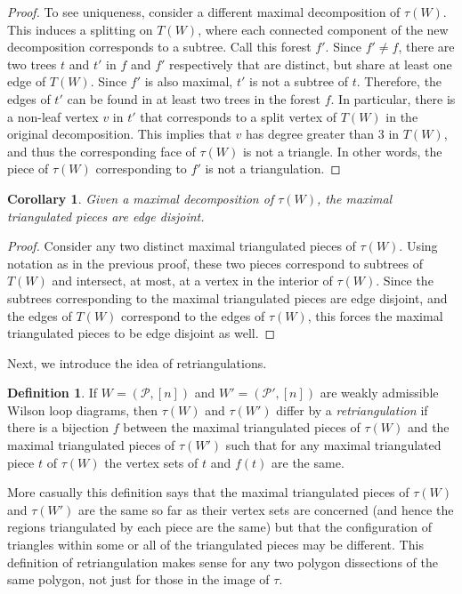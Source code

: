 \documentclass[11pt]{article}
\newcommand{\cP}{\mathcal{P}}
\newtheorem{cor}[thm]{Corollary}
\theoremstyle{remark}
\theoremstyle{definition}
\newtheorem{dfn}[thm]{Definition}
\begin{document}
\begin{proof}
To see uniqueness, consider a different maximal decomposition of $\tau(W)$. This induces a splitting on $T(W)$, where each connected component of the new decomposition corresponds to a subtree. Call this forest $f'$. Since $f' \neq f$, there are two trees $t$ and $t'$ in $f$ and $f'$ respectively that are distinct, but share at least one edge of $T(W)$. Since $f'$ is also maximal, $t'$ is not a subtree of $t$. Therefore, the edges of $t'$ can be found in at least two trees in the forest $f$. In particular, there is a non-leaf vertex $v$ in $t'$ that corresponds to a split vertex of $T(W)$ in the original decomposition.
This implies that $v$ has degree greater than $3$ in $T(W)$, and thus the corresponding face of $\tau(W)$ is not a triangle. In other words, the piece of $\tau(W)$ corresponding to $f'$ is not a triangulation. 
\end{proof}

\begin{cor} \label{maxtriangdisjointcor}
Given a maximal decomposition of $\tau(W)$, the maximal triangulated pieces are edge disjoint.
\end{cor}

\begin{proof}
Consider any two distinct maximal triangulated pieces of $\tau(W)$. Using notation as in the previous proof, these two pieces correspond to subtrees of $T(W)$ and intersect, at most, at a vertex in the interior of $\tau(W)$. Since the subtrees corresponding to the maximal triangulated pieces are edge disjoint, and the edges of $T(W)$ correspond to the edges of $\tau(W)$, this forces the maximal triangulated pieces to be edge disjoint as well.
\end{proof}


Next, we introduce the idea of retriangulations. 
\begin{dfn} \label{retriangulation}
  If $W = (\cP, [n])$ and $W' = (\cP', [n])$ are weakly admissible Wilson loop diagrams, then $\tau(W)$ and $\tau(W')$  differ by a \emph{retriangulation} if there is a bijection $f$ between the maximal triangulated pieces of $\tau(W)$ and the maximal triangulated pieces of $\tau(W')$ such that for any maximal triangulated piece $t$ of $\tau(W)$ the vertex sets of $t$ and $f(t)$ are the same.
\end{dfn}
More casually this definition says that the maximal triangulated pieces of $\tau(W)$ and $\tau(W')$ are the same so far as their vertex sets are concerned (and hence the regions triangulated by each piece are the same) but that the configuration of triangles within some or all of the triangulated pieces may be different. This definition of retriangulation makes sense for any two polygon dissections of the same polygon, not just for those in the image of $\tau$. 
   
\end{document}
